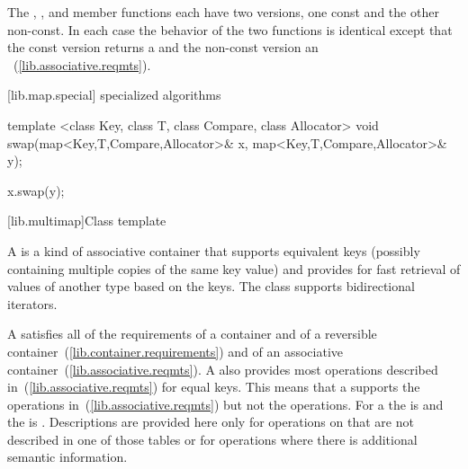 \begin{itemdescr}
\pnum
The
,
,
and
member functions each have two versions,
one const and the other non-const.
In each case the behavior of the two functions is identical
except that the const version returns a
and the non-const version an
~(\ref{lib.associative.reqmts}).
\end{itemdescr}

[lib.map.special]{ specialized algorithms}

%
%
\begin{itemdecl}
template <class Key, class T, class Compare, class Allocator>
  void swap(map<Key,T,Compare,Allocator>& x,
            map<Key,T,Compare,Allocator>& y);
\end{itemdecl}

\begin{itemdescr}
\pnum
\effects
\begin{codeblock}
    x.swap(y);
\end{codeblock}
\end{itemdescr}

[lib.multimap]{Class template }

\pnum
{}%
A
is a kind of associative container that supports equivalent keys (possibly containing multiple copies of
the same key value) and provides for fast retrieval of values of another type
based on the keys.
The
class
supports bidirectional iterators.

\pnum
A
 satisfies all of the requirements of a container and of a
reversible container~(\ref{lib.container.requirements}) and of an associative
container~(\ref{lib.associative.reqmts}).
A
also provides most operations described in~(\ref{lib.associative.reqmts})
for equal keys.
This means that a
supports the
operations in~(\ref{lib.associative.reqmts})
but not the
operations.
For a
the
is
and the
is
.
Descriptions are provided here only for operations on
that are not described in one of those tables
or for operations where there is additional semantic information.

